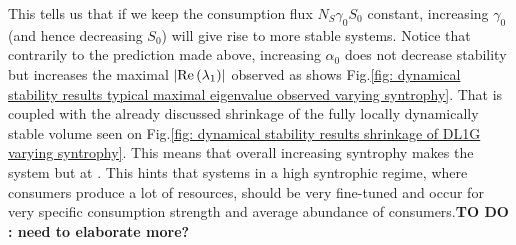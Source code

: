 \documentclass[12pt, titlepage]{report}
\begin{document}
This tells us that if we keep the consumption flux $N_S \gamma_0 S_0$ constant, increasing $\gamma_0$ (and hence decreasing $S_0$) will give rise to more stable systems. Notice that contrarily to the prediction made above, increasing $\alpha_0$ does not decrease stability but increases the maximal $\left|{\text{Re}\left(\lambda_1\right)}\right|$ observed as shows Fig.\ref{fig: dynamical stability results typical maximal eigenvalue observed varying syntrophy}. That is coupled with the already discussed shrinkage of the fully locally dynamically stable volume seen on Fig.\ref{fig: dynamical stability results shrinkage of DL1G varying syntrophy}. This means that overall increasing syntrophy makes the system  but at . This hints that systems in a high syntrophic regime, where consumers produce a lot of resources, should be very fine-tuned and occur for very specific consumption strength and average abundance of consumers.\textbf{TO DO : need to elaborate more?}
\end{document}
